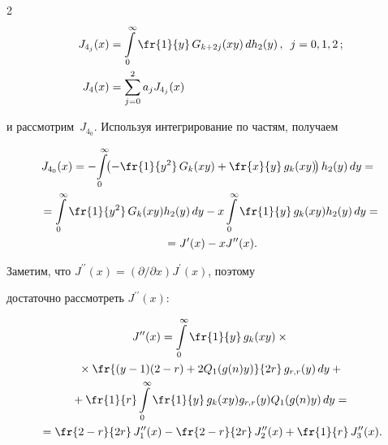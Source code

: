 \begin{multicols}{2}
\begin{align*}
 J_{4_j}(x) &= \int\limits^{\infty}_{0} \fr{1}{y}\,G_{k+2j}(xy)\,dh_2(y)\,, \enskip j = 0,1,2\,; 


\\


J_4(x)&= \sum\limits_{j=0}^{2} a_j  J_{4_j}(x)


\end{align*}


и рассмотрим~$J_{4_0}$. Используя интегрирование по частям, получаем


\begin{multline}


\label{j40}


 \hspace*{-3pt}J_{4_0}(x) = -\!\int\limits^{\infty}_{0} \!\!\left( -\fr{1}{y^2}\,G_{k}(xy) + 


\fr{x}{y}\,g_{k}(xy)\!\right) h_2(y)\,dy ={}\\


{}= \int\limits^{\infty}_{0} \fr{1}{y^2}\,G_{k}(xy) h_2(y)\,dy - x \int\limits^{\infty}_{0} 


\fr{1}{y}\,g_{k}(xy) h_2(y)\,dy ={}\\


{}= J^{\prime}(x) - x J^{\prime\prime}(x).


\end{multline}





Заметим, что $J^{\prime\prime}(x) = ({\partial}/{\partial x}) J^{\prime}(x)$, поэтому 


достаточно рассмотреть $J^{\prime\prime}(x)$:


\begin{multline*}


 J^{\prime\prime}(x) = \int\limits^{\infty}_{0}\fr{1}{y}\,g_k(xy) \times{}\\


 {}\times \fr{(y - 1)(2 - 


r) + 2 Q_1(g(n)y)}{2 r}\,g_{r,r}(y)\,dy +{} \\


{}+ \fr{1}{r}  \int\limits^{\infty}_{0} \fr{1}{y} \,g_k(xy) g_{r,r}(y) 


Q_1(g(n) y)\,dy =  {}\\


{}=


\fr{2-r}{2r}\,J_1^{\prime\prime}(x) - \fr{2-r}{2r}\,J_2^{\prime\prime}(x) + 


\fr{1}{r}\,J_3^{\prime\prime}(x).



\end{multline*}
\end{multicols}
